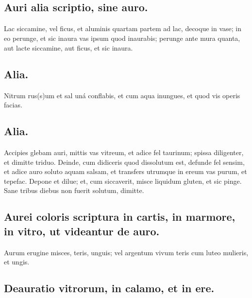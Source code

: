 \documentclass[a4paper, 11pt, oneside, polutonikogreek, italian]{article}
\begin{document}
\subsection{Auri alia scriptio, sine auro.}
\paragraph{}
Lac siccamine, vel ficus, et aluminis quartam partem ad lac, decoque in vase; in eo perunge, et sic inaura vas ipsum quod inaurabis; perunge ante mura quanta, aut lacte siccamine, aut ficus, et sic inaura.

\subsection{Alia.}
\paragraph{}
Nitrum rus(s)um et sal uná conflabis, et cum aqua inungues, et quod vis operis facias.

\subsection{Alia.}
\paragraph{}
Accipies glebam auri, mittis vas vitreum, et adice fel taurinum; spissa diligenter, et dimitte triduo. Deinde, cum didiceris quod dissolutum est, defunde fel sensim, et adice auro soluto aquam salsam, et transfers utrumque in ereum vas purum, et tepefac. Depone et dilue; et, cum siccaverit, misce liquidum gluten, et sic pinge. Sane tribus diebus non fuerit solutum, dimitte.

\subsection{Aurei coloris scriptura in cartis, in marmore, in vitro, ut videantur de auro.}
\paragraph{}
Aurum erugine misces, teris, unguis; vel argentum vivum teris cum luteo mulieris, et ungis.

\subsection{Deauratio vitrorum, in calamo, et in ere.}
\end{document}
